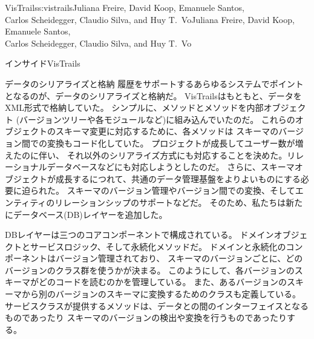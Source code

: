 \begin{aosachaptertoc}{VisTrails}{s:vistrails}{Juliana Freire, David Koop, Emanuele Santos, \\ Carlos Scheidegger, Claudio Silva, and Huy T.\ Vo}{Juliana Freire, David Koop, Emanuele Santos, \\ \hspace*{0.9cm} Carlos Scheidegger, Claudio Silva, and Huy T.\ Vo}
\begin{aosasect1}{インサイドVisTrails}
\begin{aosasect2}{データのシリアライズと格納}
履歴をサポートするあらゆるシステムでポイントとなるのが、データのシリアライズと格納だ。
VisTrailsはもともと、データをXML形式で格納していた。
シンプルに、メソッドとメソッドを内部オブジェクト
(バージョンツリーや各モジュールなど)に組み込んでいたのだ。
これらのオブジェクトのスキーマ変更に対応するために、各メソッドは
スキーマのバージョン間での変換もコード化していた。
プロジェクトが成長してユーザー数が増えたのに伴い、
それ以外のシリアライズ方式にも対応することを決めた。リレーショナルデータベースなどにも対応しようとしたのだ。
さらに、スキーマオブジェクトが成長するにつれて、共通のデータ管理基盤をよりよいものにする必要に迫られた。
スキーマのバージョン管理やバージョン間での変換、そしてエンティティのリレーションシップのサポートなどだ。
そのため、私たちは新たにデータベース(DB)レイヤーを追加した。

DBレイヤーは三つのコアコンポーネントで構成されている。
ドメインオブジェクトとサービスロジック、そして永続化メソッドだ。
ドメインと永続化のコンポーネントはバージョン管理されており、
スキーマのバージョンごとに、どのバージョンのクラス群を使うかが決まる。
このようにして、各バージョンのスキーマがどのコードを読むのかを管理している。
また、あるバージョンのスキーマから別のバージョンのスキーマに変換するためのクラスも定義している。
サービスクラスが提供するメソッドは、データとの間のインターフェイスとなるものであったり
スキーマのバージョンの検出や変換を行うものであったりする。


\end{aosasect2}
\end{aosasect1}
\end{aosachaptertoc}
